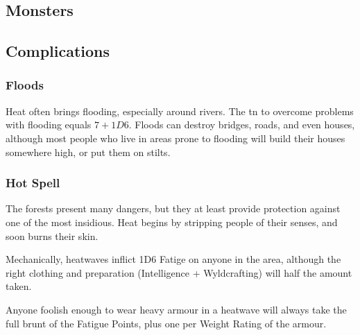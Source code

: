 \begin{multicols}{2}
\subsection{Monsters}

\encMonsters

\subsection{Complications}

\subsubsection{Floods}

Heat often brings flooding, especially around rivers.
The \gls{tn} to overcome problems with flooding equals $7 + 1D6$.
Floods can destroy bridges, roads, and even houses, although most people who live in areas prone to flooding will build their houses somewhere high, or put them on stilts.

\subsubsection{Hot Spell}

The forests present many dangers, but they at least provide protection against one of the most insidious.
Heat begins by stripping people of their senses, and soon burns their skin.

Mechanically, heatwaves inflict 1D6 Fatige on anyone in the area, although the right clothing and preparation (Intelligence + Wyldcrafting) will half the amount taken.

Anyone foolish enough to wear heavy armour in a heatwave will always take the full brunt of the Fatigue Points, plus one per Weight Rating of the armour.


\end{multicols}
